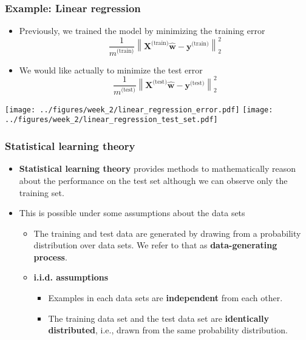 \documentclass[notes]{beamer}          %
\newcommand{\vect}[1]{\bm{#1}}
\newcommand{\norm}[1]{\left\lVert#1\right\rVert}
\providecommand{\norm}[1]{\lVert#1\rVert}
\begin{document}
\begin{frame}
\frametitle{Example: Linear regression}
 \begin{itemize}
        \item Previously, we trained the model by minimizing the training error
        $$
        \frac{1}{m^{\mbox{(train)}}}\norm{\vect{X}^{\mbox{(train)}}\hat{\vect{w}} - \vect{y}^{\mbox{(train)}}}_2^2
        $$
        \item We would like actually to minimize the test error
         $$
        \frac{1}{m^{\mbox{(test)}}}\norm{\vect{X}^{\mbox{(test)}}\hat{\vect{w}} - \vect{y}^{\mbox{(test)}}}_2^2
        $$
\end{itemize}
\begin{center}
        \texttt{[image: ../figures/week\_2/linear\_regression\_error.pdf]}
        \texttt{[image: ../figures/week\_2/linear\_regression\_test\_set.pdf]}
\end{center}
\end{frame}


\begin{frame}
\frametitle{Statistical learning theory}
    \begin{itemize}
        \item {\bf Statistical learning theory} provides methods to mathematically reason about the performance on the test set although we can observe only the training set.
        \item This is possible under some assumptions about the data sets
            \begin{itemize}
                \item The training and test data are generated by drawing from a probability distribution over data sets. We refer to that as {\bf data-generating process}.
                \item {\bf i.i.d. assumptions}
                    \begin{itemize}
                        \item Examples in each data sets are {\bf independent} from each other.
                        \item The training data set and the test data set are {\bf identically distributed}, i.e., drawn from the same probability distribution.
                    \end{itemize}
            \end{itemize}

    \end{itemize}
\end{frame}
\end{document}
